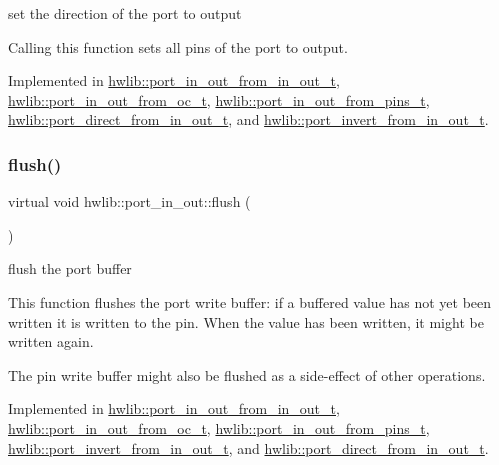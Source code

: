 set the direction of the port to output

Calling this function sets all pins of the port to output. 

Implemented in \hyperlink{classhwlib_1_1port__in__out__from__in__out__t_aa148c50e132f6657d4c3a292b91896da}{hwlib\+::port\+\_\+in\+\_\+out\+\_\+from\+\_\+in\+\_\+out\+\_\+t}, \hyperlink{classhwlib_1_1port__in__out__from__oc__t_ab4cd56460a6627c3fc7f39cb2e78a9c8}{hwlib\+::port\+\_\+in\+\_\+out\+\_\+from\+\_\+oc\+\_\+t}, \hyperlink{classhwlib_1_1port__in__out__from__pins__t_a2fb1966c582d06ecaa8ba67ab6fe2be0}{hwlib\+::port\+\_\+in\+\_\+out\+\_\+from\+\_\+pins\+\_\+t}, \hyperlink{classhwlib_1_1port__direct__from__in__out__t_a8702543e5a779026dd0b8602aaf5ae56}{hwlib\+::port\+\_\+direct\+\_\+from\+\_\+in\+\_\+out\+\_\+t}, and \hyperlink{classhwlib_1_1port__invert__from__in__out__t_a081fcd37931c8b02a8bcc61899ea5346}{hwlib\+::port\+\_\+invert\+\_\+from\+\_\+in\+\_\+out\+\_\+t}.

\mbox{\label{classhwlib_1_1port__in__out_a164564bcd08c137f0ff2e6445e9cfe5e}} 
\subsubsection{\texorpdfstring{flush()}{flush()}}
{\footnotesize\ttfamily virtual void hwlib\+::port\+\_\+in\+\_\+out\+::flush (\begin{DoxyParamCaption}{ }\end{DoxyParamCaption})\hspace{0.3cm}{\ttfamily [pure virtual]}}

flush the port buffer

This function flushes the port write buffer\+: if a buffered value has not yet been written it is written to the pin. When the value has been written, it might be written again.

The pin write buffer might also be flushed as a side-\/effect of other operations. 

Implemented in \hyperlink{classhwlib_1_1port__in__out__from__in__out__t_a7ae629f8dc18f39975494b5f370551b2}{hwlib\+::port\+\_\+in\+\_\+out\+\_\+from\+\_\+in\+\_\+out\+\_\+t}, \hyperlink{classhwlib_1_1port__in__out__from__oc__t_aed77890fb29c1b3e5991786e8bd419d5}{hwlib\+::port\+\_\+in\+\_\+out\+\_\+from\+\_\+oc\+\_\+t}, \hyperlink{classhwlib_1_1port__in__out__from__pins__t_ad93519fe8087b7b65f35442f8c505ccf}{hwlib\+::port\+\_\+in\+\_\+out\+\_\+from\+\_\+pins\+\_\+t}, \hyperlink{classhwlib_1_1port__invert__from__in__out__t_a9066c534e517baf82995863bb67cb443}{hwlib\+::port\+\_\+invert\+\_\+from\+\_\+in\+\_\+out\+\_\+t}, and \hyperlink{classhwlib_1_1port__direct__from__in__out__t_a59745ee886092e4ff81906aafedbcfdd}{hwlib\+::port\+\_\+direct\+\_\+from\+\_\+in\+\_\+out\+\_\+t}.

